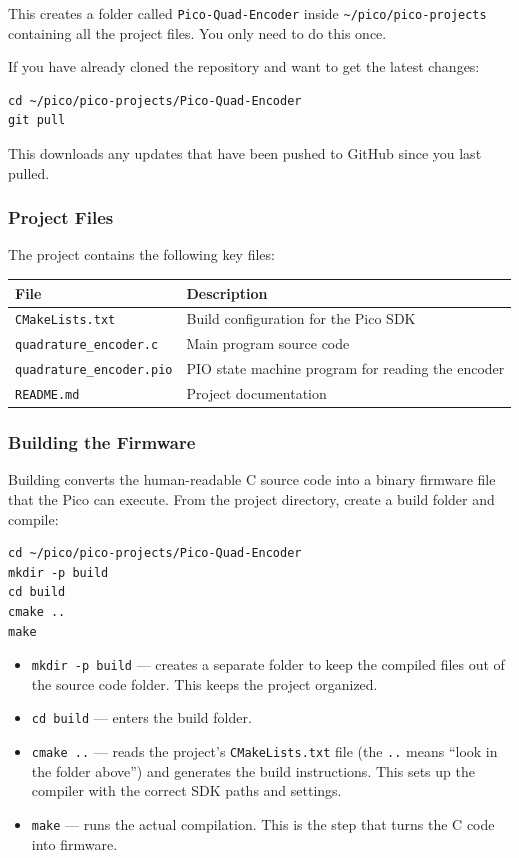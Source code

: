 \documentclass[main.tex]{subfiles}
\begin{document}
\noindent This creates a folder called \texttt{Pico-Quad-Encoder} inside \texttt{\textasciitilde/pico/pico-projects} containing all the project files. You only need to do this once.

\vspace{6pt}
\noindent If you have already cloned the repository and want to get the latest changes:
\begin{verbatim}
cd ~/pico/pico-projects/Pico-Quad-Encoder
git pull
\end{verbatim}

\noindent This downloads any updates that have been pushed to GitHub since you last pulled.

\subsubsection{Project Files}

The project contains the following key files:

\begin{tabularx}{\textwidth}{l X}
\textbf{File} & \textbf{Description} \\
\hline
\texttt{CMakeLists.txt} & Build configuration for the Pico SDK \\
\texttt{quadrature\_encoder.c} & Main program source code \\
\texttt{quadrature\_encoder.pio} & PIO state machine program for reading the encoder \\
\texttt{README.md} & Project documentation \\
\end{tabularx}

\subsubsection{Building the Firmware}

Building converts the human-readable C source code into a binary firmware file that the Pico can execute. From the project directory, create a build folder and compile:

\begin{verbatim}
cd ~/pico/pico-projects/Pico-Quad-Encoder
mkdir -p build
cd build
cmake ..
make
\end{verbatim}

\begin{itemize}
    \item \texttt{mkdir -p build} --- creates a separate folder to keep the compiled files out of the source code folder. This keeps the project organized.
    \item \texttt{cd build} --- enters the build folder.
    \item \texttt{cmake ..} --- reads the project's \texttt{CMakeLists.txt} file (the \texttt{..} means ``look in the folder above'') and generates the build instructions. This sets up the compiler with the correct SDK paths and settings.
    \item \texttt{make} --- runs the actual compilation. This is the step that turns the C code into firmware.
\end{itemize}
\end{document}
